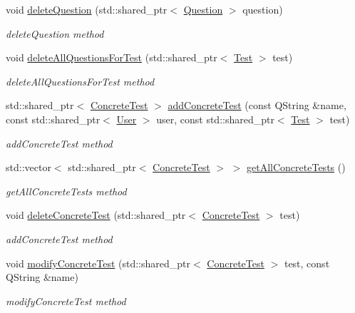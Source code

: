 \begin{DoxyCompactItemize}
void \hyperlink{class_db_manager_afd1ef019f752995c4b06f00c29b4ebdc}{delete\+Question} (std\+::shared\+\_\+ptr$<$ \hyperlink{class_question}{Question} $>$ question)
\begin{DoxyCompactList}\small\item\em delete\+Question method \end{DoxyCompactList}\item 
void \hyperlink{class_db_manager_a1a68105f460a2c3bde0b8c97749588a9}{delete\+All\+Questions\+For\+Test} (std\+::shared\+\_\+ptr$<$ \hyperlink{class_test}{Test} $>$ test)
\begin{DoxyCompactList}\small\item\em delete\+All\+Questions\+For\+Test method \end{DoxyCompactList}\item 
std\+::shared\+\_\+ptr$<$ \hyperlink{class_concrete_test}{Concrete\+Test} $>$ \hyperlink{class_db_manager_afc16172b22f9c337dec284a49ec12b51}{add\+Concrete\+Test} (const Q\+String \&name, const std\+::shared\+\_\+ptr$<$ \hyperlink{class_user}{User} $>$ user, const std\+::shared\+\_\+ptr$<$ \hyperlink{class_test}{Test} $>$ test)
\begin{DoxyCompactList}\small\item\em add\+Concrete\+Test method \end{DoxyCompactList}\item 
std\+::vector$<$ std\+::shared\+\_\+ptr$<$ \hyperlink{class_concrete_test}{Concrete\+Test} $>$ $>$ \hyperlink{class_db_manager_a78e619d59729619e3faaca7335b736c0}{get\+All\+Concrete\+Tests} ()
\begin{DoxyCompactList}\small\item\em get\+All\+Concrete\+Tests method \end{DoxyCompactList}\item 
void \hyperlink{class_db_manager_a3fa39305c4949868abcf131fc2dc25b8}{delete\+Concrete\+Test} (std\+::shared\+\_\+ptr$<$ \hyperlink{class_concrete_test}{Concrete\+Test} $>$ test)
\begin{DoxyCompactList}\small\item\em add\+Concrete\+Test method \end{DoxyCompactList}\item 
void \hyperlink{class_db_manager_a2b2683ab2b91b3189538242c67f0bc45}{modify\+Concrete\+Test} (std\+::shared\+\_\+ptr$<$ \hyperlink{class_concrete_test}{Concrete\+Test} $>$ test, const Q\+String \&name)
\begin{DoxyCompactList}\small\item\em modify\+Concrete\+Test method \end{DoxyCompactList}\item 

\end{DoxyCompactItemize}
